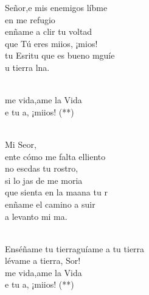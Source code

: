 \documentclass[12pt]{article}
\begin{document}
\begin{multicols*}{2}
\begin{cancion}%
	 Señor,e mis enemigos líbme\\
	en  me refugio\\
	enñame a clir tu voltad\\
	que Tú eres miios, ¡mios!\\
	tu Esritu que es bueno mguíe\\
	 u tierra lna.\\\jump\\
	\begin{chorus}%
	me vida,ame la Vida\\
	e tu a, ¡miios! (**)\\
	\end{chorus}%
	\jump\\
	Mi Seor, \\
	ente cómo me falta elliento\\
	no escdas tu rostro, \\
	si lo jas de  me moria \\
	 que sienta en la maana tu r\\
	enñame el camino a suir  \\
	a  levanto mi ma.\\\jump\\
	\begin{chorus}%
	Enséñame tu tierraguíame a tu tierra\\
	lévame a tierra, Sor! \\
\jump
	me vida,ame la Vida\\
	e tu a, ¡miios! (**)\\
	\end{chorus}%
	\jump\\
\end{cancion}%


\end{multicols*}
\end{document}
